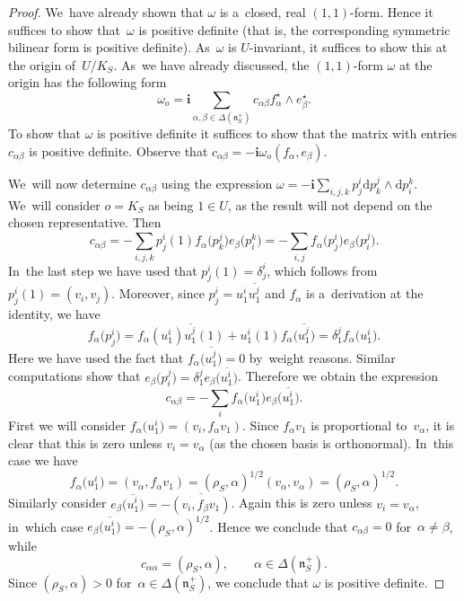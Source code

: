 \documentclass[10pt,a4paper]{amsart}
\numberwithin{equation}{section}
\newcommand{\lien}{\mathfrak{n}}
\newcommand{\diff}{\mathrm{d}}
\newcommand{\iu}{\boldsymbol{i}}
\newcommand{\kafo}{\omega}
\newcommand{\homroot}{\Delta(\lien_S^+)}
\begin{document}
\begin{proof}
We~have already shown that $\kafo$ is a~closed, real $(1, 1)$-form.
Hence it suffices to show that~$\kafo$ is positive definite (that is, the corresponding symmetric bilinear form is positive definite).
As~$\kafo$ is $U$-invariant, it suffices to show this at the origin of~$U / K_S$.
As~we have already discussed, the $(1, 1)$-form $\kafo$ at the origin has the following form
\[
\kafo_o = \iu \sum_{\alpha, \beta \in \homroot} c_{\alpha \beta} f_\alpha^\star \wedge e_\beta^\star.
\]
To show that $\kafo$ is positive definite it suffices to show that the matrix with entries $c_{\alpha \beta}$ is positive definite.
Observe that $c_{\alpha \beta} = - \iu \kafo_o(f_\alpha, e_\beta)$.

We~will now determine $c_{\alpha \beta}$ using the expression $\kafo = - \iu \sum_{i, j, k} p^i_j \diff p^j_k \wedge \diff p^k_i$.
We~will consider $o = K_S$ as being $1 \in U$, as the result will not depend on the chosen representative. Then
\[
c_{\alpha \beta} = - \sum_{i, j, k} p^i_j(1) f_\alpha\big(p^j_k\big) e_\beta\big(p^k_i\big)
= - \sum_{i, j} f_\alpha\big(p^i_j\big) e_\beta\big(p^j_i\big).
\]
In~the last step we have used that $p^i_j(1) = \delta^i_j$, which follows from $p^i_j(1) = (v_i, v_j)$.
Moreover, since $p^i_j = u^i_1 \overline{u^j_1}$ and $f_\alpha$ is a~derivation at the identity, we have
\[
f_\alpha\big(p^i_j\big) = f_\alpha(u^i_1) \overline{u^j_1}(1) + u^i_1(1) f_\alpha\big(\overline{u^j_1}\big)
= \delta^j_1 f_\alpha\big(u^i_1\big).
\]
Here we have used the fact that $f_\alpha\big(\overline{u^j_1}\big) = 0$ by~weight reasons.
Similar computations show that $e_\beta\big(p^j_i\big) = \delta^j_1 e_\beta\big(\overline{u^i_1}\big)$.
Therefore we obtain the expression
\[
c_{\alpha \beta} = - \sum_i f_\alpha\big(u^i_1\big) e_\beta\big(\overline{u^i_1}\big).
\]
First we will consider $f_\alpha\big(u^i_1\big) = (v_i, f_\alpha v_1)$.
Since $f_\alpha v_1$ is proportional to~$v_\alpha$, it is clear that this is zero unless $v_i = v_\alpha$ (as the chosen basis is orthonormal).
In~this case we have
\[
f_\alpha\big(u^i_1\big) = (v_\alpha, f_\alpha v_1) = (\rho_S, \alpha)^{1/2} (v_\alpha, v_\alpha) = (\rho_S, \alpha)^{1/2}.
\]
Similarly consider $e_\beta\big(\overline{u^i_1}\big) = - \overline{(v_i, f_\beta v_1)}$.
Again this is zero unless $v_i = v_\alpha$, in~which case $e_\beta\big(\overline{u^i_1}\big) = -(\rho_S, \alpha)^{1/2}$.
Hence we conclude that $c_{\alpha \beta} = 0$ for~$\alpha \neq \beta$, while
\[
c_{\alpha \alpha} = (\rho_S, \alpha), \qquad \alpha \in \homroot.
\]
Since $(\rho_S, \alpha) > 0$ for~$\alpha \in \homroot$, we conclude that $\kafo$ is positive definite.
\end{proof}
\end{document}
